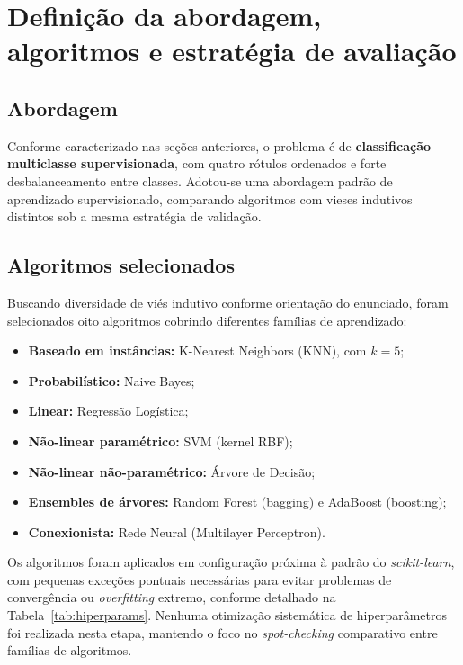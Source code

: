 \documentclass[11pt,a4paper]{article}
\begin{document}
\section{Definição da abordagem, algoritmos e estratégia de avaliação}
\label{sec:abordagem}

\subsection{Abordagem}
Conforme caracterizado nas seções anteriores, o problema é de \textbf{classificação multiclasse supervisionada}, com quatro rótulos ordenados e forte desbalanceamento entre classes. Adotou-se uma abordagem padrão de aprendizado supervisionado, comparando algoritmos com vieses indutivos distintos sob a mesma estratégia de validação.

\subsection{Algoritmos selecionados}
Buscando diversidade de viés indutivo conforme orientação do enunciado, foram selecionados oito algoritmos cobrindo diferentes famílias de aprendizado:

\begin{itemize}
\item \textbf{Baseado em instâncias:} K-Nearest Neighbors (KNN), com $k = 5$;
\item \textbf{Probabilístico:} Naive Bayes;
\item \textbf{Linear:} Regressão Logística;
\item \textbf{Não-linear paramétrico:} SVM (kernel RBF);
\item \textbf{Não-linear não-paramétrico:} Árvore de Decisão;
\item \textbf{Ensembles de árvores:} Random Forest (bagging) e AdaBoost (boosting);
\item \textbf{Conexionista:} Rede Neural (Multilayer Perceptron).
\end{itemize}

Os algoritmos foram aplicados em configuração próxima à padrão do \textit{scikit-learn}, com pequenas exceções pontuais necessárias para evitar problemas de convergência ou \textit{overfitting} extremo, conforme detalhado na Tabela~\ref{tab:hiperparams}. Nenhuma otimização sistemática de hiperparâmetros foi realizada nesta etapa, mantendo o foco no \textit{spot-checking} comparativo entre famílias de algoritmos.
\end{document}
